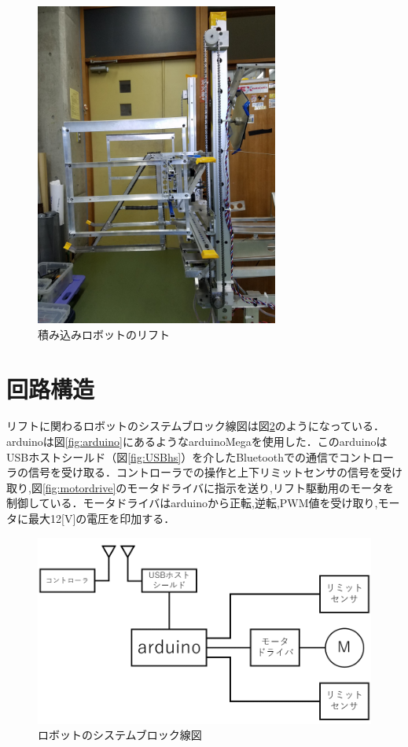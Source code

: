 \begin{figure}[htbp]
  \begin{center}
    \includegraphics[width=80mm]{img/lift.jpg}
    \end{center}
  \caption{積み込みロボットのリフト}
 \label{fig:lift}
\end{figure}

\section{回路構造}
リフトに関わるロボットのシステムブロック線図は図\ref{fig:roboblock}のようになっている．arduinoは図\ref{fig:arduino}にあるようなarduinoMegaを使用した．このarduinoはUSBホストシールド（図\ref{fig:USBhs}）を介したBluetoothでの通信でコントローラの信号を受け取る．コントローラでの操作と上下リミットセンサの信号を受け取り,図\ref{fig:motordrive}のモータドライバに指示を送り,リフト駆動用のモータを制御している．モータドライバはarduinoから正転,逆転,PWM値を受け取り,モータに最大12[V]の電圧を印加する．

\begin{figure}[htbp]
  \begin{center}
    \includegraphics[width=120mm]{img/roboblock.png}
    \end{center}
  \caption{ロボットのシステムブロック線図}
 \label{fig:roboblock}
\end{figure}

